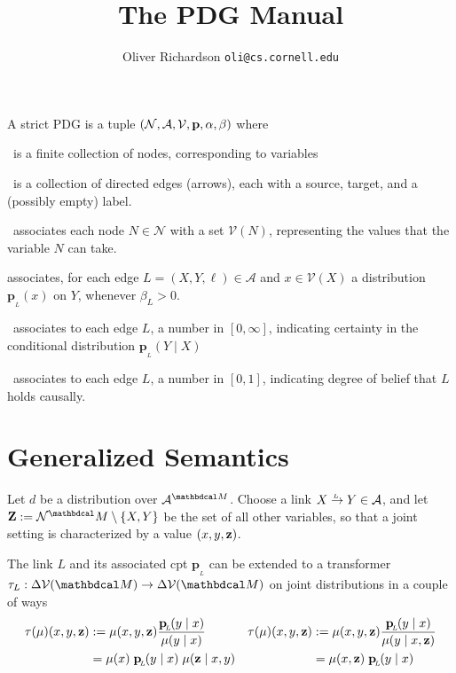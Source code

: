 \documentclass{article}
\title{The PDG Manual}
\author{Oliver Richardson  \texttt{oli@cs.cornell.edu}}
\newcommand{\bp}[1][L]{\mathbf{p}_{\!_#1\!}}
\newcommand{\V}{\mathcal V}
\newcommand{\N}{\mathcal N}
\newcommand{\Ed}{\mathcal A}
\newcommand{\ed}[3]{#2
	\overset{\smash{\mskip-5mu\raisebox{-1pt}{$\scriptscriptstyle
				#1$}}}{\rightarrow} #3}
\newcommand{\dg}[1]{\mathbdcal #1}
\begin{document}
	\maketitle
	
	\def\mnvars[#1]{(\N#1, \Ed#1, \V#1, \mat p#1, \alpha#1,\beta#1)}
	\begin{defn}[sPDG]\label{def:model}
		A strict PDG is a tuple $\mnvars[]$ where
		\begin{description}[nosep]
			\item[$\N$]~is a finite collection of nodes, corresponding to variables
			\item[$\Ed$]~is a collection of directed edges (arrows), each with a source, target, and a (possibly empty) label.
			\item[$\V$]~associates each node $N \in \N$ with a set $\V(N)$,
			representing the values that the variable $N$ can take. 
			\item[$\mathbf p$] associates, for each edge $L = (X,Y, \ell) \in \Ed$ and $x \in \V(X)$ a distribution $\bp(x)$ on $Y$, whenever $\beta_L > 0$.
			\item[$\beta$]~associates to each edge $L$, a number in $[0,\infty]$, indicating certainty in the conditional distribution $\bp(Y \mid X)$ 
			\item[$\alpha$]~associates to each edge $L$, a number in $[0,1]$, indicating degree of belief that $L$ holds causally.
		\end{description}
		\vspace{-1.4em}
	\end{defn}

	
	
	\section{Generalized Semantics}
	Let $d$ be a distribution over $\Ed^{\dg M}$. 
	Choose a link $\ed LXY \in \Ed$, and let $\mathbf Z := \N^\dg M \setminus \{X, Y\}$ be the set of all other variables, so that a joint setting is characterized by a value $(x,y,\mathbf z)$.
	
	The link $L$ and its associated cpt $\bp$ can be extended to a transformer $\tau_L: \Delta \V(\dg M) \to \Delta \V(\dg M)$ on joint distributions in a couple of ways
	\begin{align*}
		 \tau(\mu)(x,y,\mat z) &:= \mu(x,y,\mat z) \frac{\bp(y \mid x)}{\mu(y\mid x)} 
			 &  \tau(\mu)(x,y,\mat z) &:= \mu(x,y,\mat z) \frac{\bp(y \mid x)}{\mu(y\mid x, \mathbf z)} \\
 			&= \mu(x)\; \bp(y \mid x)\; \mu(\mat z \mid x,y) 
			 &   &= \mu(x,\mat z)\; \bp(y \mid x)
	\end{align*}

		
	
	
\end{document}

